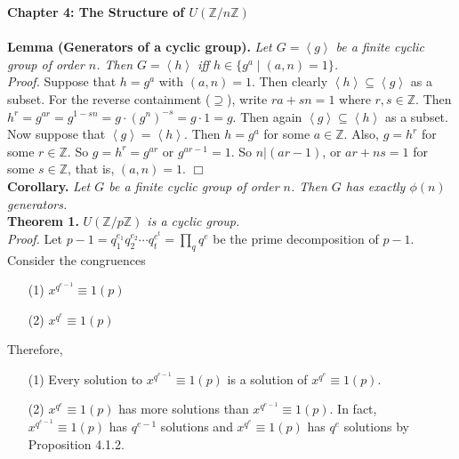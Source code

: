 \documentclass{article}
\begin{document}
\textbf{\Large Chapter 4: The Structure of $U(\mathbb{Z}/n\mathbb{Z})$} \\\\

\textbf{Lemma (Generators of a cyclic group).} \emph{Let $G = \left \langle g \right \rangle$
be a finite cyclic group of order $n$. Then $G = \left \langle h \right \rangle$ iff
$h \in \{ g^a \mid (a, n) = 1 \}$.} \\

\emph{Proof.}
Suppose that $h = g^a$ with $(a, n) = 1$. Then clearly $\left \langle h \right \rangle \subseteq
\left \langle g \right \rangle$ as a subset. For the reverse containment ($\supseteq$),
write $ra + sn = 1$ where $r, s \in \mathbb{Z}$. Then
$h^r = g^{ar} = g^{1 - sn} = g \cdot (g^n)^{-s} = g \cdot 1 = g$. Then again
$\left \langle g \right \rangle \subseteq \left \langle h \right \rangle$ as a subset. \\

Now suppose that $\left \langle g \right \rangle = \left \langle h \right \rangle$.
Then $h = g^a$ for some $a \in \mathbb{Z}$. Also, $g = h^r$ for some $r \in \mathbb{Z}$.
So $g = h^r = g^{ar}$ or $g^{ar - 1} = 1$. So $n | (ar - 1)$, or
$ar + ns = 1$ for some $s \in \mathbb{Z}$, that is, $(a, n) = 1$.
$\Box$ \\

\textbf{Corollary.} \emph{Let $G$ be a finite cyclic group of order $n$.
Then $G$ has exactly $\phi(n)$ generators.} \\

\textbf{Theorem 1.} \emph{$U(\mathbb{Z}/p\mathbb{Z})$ is a cyclic group.} \\

\emph{Proof.}
Let $p - 1 = q_1^{e_1} q_2^{e_2} \cdots q_t^{e^t} = \prod_{q} q^e$ be the prime
decomposition of $p - 1$. Consider the congruences

\begin{enumerate}
\item[(1)]
$x^{q^{e-1}} \equiv 1 (p)$
\item[(2)]
$x^{q^{e}} \equiv 1 (p)$
\end{enumerate}

Therefore,

\begin{enumerate}
\item[(1)]
Every solution to $x^{q^{e-1}} \equiv 1 (p)$ is a solution of $x^{q^{e}} \equiv 1 (p)$.
\item[(2)]
$x^{q^{e}} \equiv 1 (p)$ has more solutions than $x^{q^{e-1}} \equiv 1 (p)$.
In fact, $x^{q^{e-1}} \equiv 1 (p)$ has $q^{e-1}$ solutions and $x^{q^{e}} \equiv 1 (p)$
has $q^{e}$ solutions by Proposition 4.1.2.
\end{enumerate}
\end{document}
